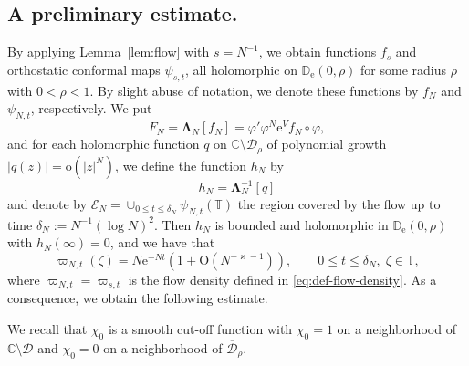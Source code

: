 \documentclass{amsart}
\newcommand{\be}{\begin{equation}}
\newcommand{\ee}{\end{equation}}
\newcommand{\C}{\mathbb{C}}
\newcommand{\D}{\mathbb{D}}
\newcommand{\T}{\mathbb{T}}
\newcommand{\calD}{\mathcal{D}}
\newcommand{\calE}{\mathcal{E}}
\newcommand{\Lamop}{\mathbf{\Lambda}}
\theoremstyle{definition}
\theoremstyle{remark}
\newcommand{\e}{\mathrm{e}}
\newcommand{\Ordo}{\mathrm{O}}
\newcommand{\ordo}{\mathrm{o}}
\numberwithin{equation}{subsection}
\begin{document}
\subsection{A preliminary estimate.}
By applying Lemma~\ref{lem:flow} with $s=N^{-1}$, 
we obtain functions $f_s$ 
and orthostatic conformal maps $\psi_{s,t}$, all holomorphic on
$\D_\e(0,\rho)$ for some radius $\rho$ with $0<\rho<1$. By slight abuse of
notation, we denote these functions by $f_N$ and $\psi_{N,t}$, respectively. 
We put
\be\label{eq:def-FN-pf-sect}
F_N=\Lamop_N[f_N]=\varphi'\varphi^N\e^V f_N\circ\varphi,
\ee
and for each holomorphic function $q$ on $\C\setminus\calD_\rho$ of polynomial growth
$|q(z)|=\ordo(|z|^{N})$, we define the function $h_N$ by
\be
h_N=\Lamop_N^{-1}[q]
\ee
and denote by $\calE_N=\cup_{0\le t\le \delta_N}\psi_{N,t}(\T)$ the 
region covered by the flow up to time 
$\delta_N:=N^{-1}(\log N)^2$. 
Then $h_N$ is bounded and holomorphic in $\D_\e(0,\rho)$ 
with $h_N(\infty)=0$, and we have that
\be\label{eq:form-varpi-Nt}
\varpi_{N,t}(\zeta)=N\e^{-Nt}(1+\Ordo(N^{-\varkappa-1})),
\qquad 0\le t\le \delta_N,\;\zeta\in\T,
\ee
where $\varpi_{N,t}=\varpi_{s,t}$ is the flow density defined
in \eqref{eq:def-flow-density}.
As a consequence, we obtain the following estimate.

We recall that $\chi_0$ is a smooth cut-off function
with $\chi_0= 1$ on a neighborhood of $\C\setminus\calD$
and $\chi_0=0$ on a neighborhood of $\overline{\calD}_\rho$.
\end{document}
